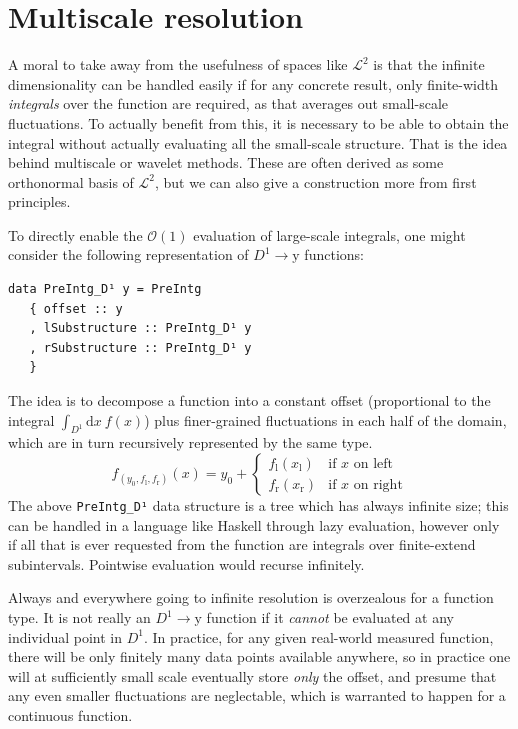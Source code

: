 \documentclass[sigplan,review,anonymous]{acmart}\settopmatter{printfolios=true,printccs=false,printacmref=false}
\begin{document}
\section{Multiscale resolution}\label{mulScaleResoIntro}
A moral to take away from the usefulness of spaces like $\mathcal{L}^2$ is that the infinite dimensionality can be handled easily if for any concrete result, only finite-width \emph{integrals} over the function are required, as that averages out small-scale fluctuations. To actually benefit from this, it is necessary to be able to obtain the integral without actually evaluating all the small-scale structure. That is the idea behind multiscale or wavelet methods. These are often derived as some orthonormal basis of $\mathcal{L}^2$, but we can also give a construction more from first principles.

To directly enable the $\mathcal{O}(1)$ evaluation of large-scale integrals, one might consider the following representation of $D^1\to \mathrm{y}$ functions:
\begin{lstlisting}
data PreIntg_D¹ y = PreIntg
   { offset :: y
   , lSubstructure :: PreIntg_D¹ y
   , rSubstructure :: PreIntg_D¹ y
   }
\end{lstlisting}
The idea is to decompose a function into a constant offset (proportional to the integral $\int_{D^1}\!\mathrm{d}x\:f(x)$) plus finer-grained fluctuations in each half of the domain, which are in turn recursively represented by the same type.
\[
  f_{(y_0,f_\mathrm{l},f_\mathrm{r})}(x)
      = y_0 + \begin{cases}
                 f_\mathrm{l}(x_\mathrm{l}) & \text{if $x$ on left}
              \\ f_\mathrm{r}(x_\mathrm{r}) & \text{if $x$ on right}
              \end{cases}
\]
The above \lstinline`PreIntg_D¹` data structure is a tree which has always infinite size; this can be handled in a language like Haskell through lazy evaluation, however only if all that is ever requested from the function are integrals over finite-extend subintervals. Pointwise evaluation would recurse infinitely.

Always and everywhere going to infinite resolution is overzealous for a function type. It is not really an $D^1\to \mathrm{y}$ function if it \emph{cannot} be evaluated at any individual point in $D^1$. In practice, for any given real-world measured function, there will be only finitely many data points available anywhere, so in practice one will at sufficiently small scale eventually store \emph{only} the offset, and presume that any even smaller fluctuations are neglectable, which is warranted to happen for a continuous function.
\end{document}
